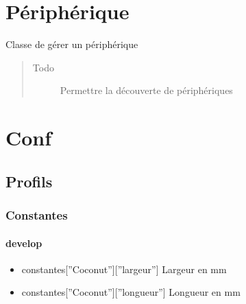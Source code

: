 \documentclass[letterpaper,10pt,french]{sphinxmanual}
\begin{document}
\chapter{Périphérique}
\label{peripherique:module-lib.peripherique}\label{peripherique::doc}\label{peripherique:peripherique}

\begin{fulllineitems}
\label{peripherique:lib.peripherique.Peripherique}
Classe de gérer un périphérique
\begin{quote}\begin{description}
\item[{Todo }] \leavevmode
Permettre la découverte de périphériques

\end{description}\end{quote}

\end{fulllineitems}



\chapter{Conf}
\label{profils::doc}\label{profils:conf}

\section{Profils}
\label{profils:profils}

\subsection{Constantes}
\label{profils:constantes}

\subsubsection{develop}
\label{profils:develop}\label{profils:module-profils.develop.constantes}\begin{itemize}
\item {} 
constantes{[}''Coconut''{]}{[}''largeur''{]} Largeur en mm

\item {} 
constantes{[}''Coconut''{]}{[}''longueur''{]} Longueur en mm

\end{itemize}
\end{document}
